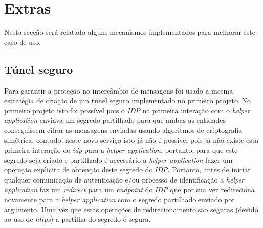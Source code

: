 \section{Extras}

\quad Nesta secção será relatado alguns mecanismos implementados para melhorar este caso de uso.

\subsection{Túnel seguro}

\quad Para garantir a proteção no intercâmbio de mensagens foi usado a mesma estratégia de criação de um túnel seguro implementado no primeiro projeto. No primeiro projeto isto foi possível pois o \textit{IDP} na primeira interação com o \textit{helper application} enviava um segredo partilhado para que ambas as entidades conseguissem cifrar as mensagens enviadas usando algoritmos de criptografia simétrica, contudo, neste novo serviço isto já não é possível pois já não existe esta primeira interação do \textit{idp} para a \textit{helper application}, portanto, para que este segredo seja criado e partilhado é necessário a \textit{helper application} fazer um operação explicita de obtenção deste segredo do \textit{IDP}. Portanto, antes de iniciar qualquer comunicação de autenticação e/ou processo de identificação a \textit{helper application} faz um \textit{redirect} para um \textit{endpoint} do \textit{IDP} que por sua vez redireciona novamente para a \textit{helper application} com o segredo partilhado enviado por argumento. Uma vez que estas operações de redirecionamento são seguras (devido ao uso de \textit{https}) a partilha do segredo é segura.




